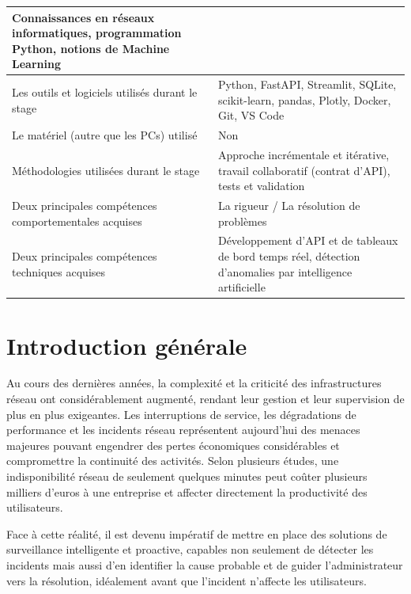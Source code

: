 \documentclass[12pt,a4paper]{report}
\begin{document}
\begin{longtable}{|>{\raggedright\arraybackslash}p{6.2cm}|>{\raggedright\arraybackslash}p{8.5cm}|}
Connaissances en réseaux informatiques, programmation Python, notions de Machine Learning \\
\hline
Les outils et logiciels utilisés durant le stage &
Python, FastAPI, Streamlit, SQLite, scikit-learn, pandas, Plotly, Docker, Git, VS Code \\
\hline
Le matériel (autre que les PCs) utilisé & Non \\
\hline
Méthodologies utilisées durant le stage & Approche incrémentale et itérative, travail collaboratif (contrat d'API), tests et validation \\
\hline
Deux principales compétences comportementales acquises & La rigueur / La résolution de problèmes \\
\hline
Deux principales compétences techniques acquises &
Développement d'API et de tableaux de bord temps réel, détection d'anomalies par intelligence artificielle \\
\hline
\end{longtable}
\renewcommand{\arraystretch}{1.0}

\chapter*{Introduction générale}

Au cours des dernières années, la complexité et la criticité des infrastructures
réseau ont considérablement augmenté, rendant leur gestion et leur supervision de
plus en plus exigeantes. Les interruptions de service, les dégradations de
performance et les incidents réseau représentent aujourd'hui des menaces majeures
pouvant engendrer des pertes économiques considérables et compromettre la
continuité des activités. Selon plusieurs études, une indisponibilité réseau de
seulement quelques minutes peut coûter plusieurs milliers d'euros à une entreprise
et affecter directement la productivité des utilisateurs.

Face à cette réalité, il est devenu impératif de mettre en place des solutions de
surveillance intelligente et proactive, capables non seulement de détecter les
incidents mais aussi d'en identifier la cause probable et de guider l'administrateur
vers la résolution, idéalement avant que l'incident n'affecte les utilisateurs.
\end{document}
